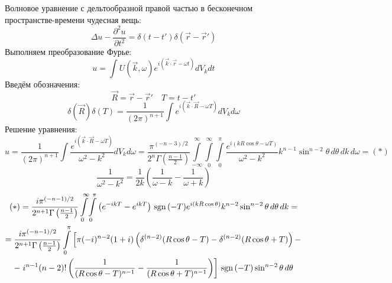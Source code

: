 Волновое уравнение с дельтообразной правой частью в бесконечном пространстве-времени чудесная вещь:
\[
	\Delta u - \frac{\partial^2 u}{\partial t^2} = \delta(t - t')\delta(\vec{r} - \vec{r}') 
\]
Выполняем преобразование Фурье:
\[
	u = \int U(\vec{k}, \omega) e^{i(\vec{k}\cdot\vec{r} - \omega t)} dV_k dt
\]
Введём обозначения:
\[
	\vec{R} = \vec{r} - \vec{r}' \quad T = t - t'
\]
\[
	\delta(\vec{R}) \delta(T) = \frac{1}{(2\pi)^{n + 1}} \int e^{i(\vec{k}\cdot\vec{R} - \omega T)} dV_k d\omega
\]
Решение уравнения:
\[
	u = \frac{1}{(2\pi)^{n + 1}} \int \frac{e^{i(\vec{k}\cdot\vec{R} - \omega T)}}{\omega^2 - k^2} dV_k d\omega =  
	\frac{\pi^{(- n - 3)/2}}{2^n\Gamma\left(\frac{n - 1}{2}\right)} 
	\int\limits_{-\infty}^{\infty}\!
	\int\limits_{0}^{\infty}\!
	\int\limits_{0}^{\pi}
	 \frac{e^{i(k R \cos \theta - \omega T)}}{\omega^2 - k^2} k^{n - 1} \sin^{n - 2} \theta\, d\theta\, dk\, d\omega = (*)
\]
\[
	\frac{1}{\omega^2 - k^2} = \frac{1}{2k} \left(\frac{1}{\omega - k} - \frac{1}{\omega + k} \right)
\]
\[
	\begin{gathered}
	(*) =
	\frac{i \pi^{(- n - 1)/2}}{2^{n + 1}\Gamma\left(\frac{n - 1}{2}\right)} 
	\int\limits_{0}^{\infty}\!
	\int\limits_{0}^{\pi}
	\left(e^{ - i k T}  - e^{i k T} \right) \mathrm{\,sgn}\,(-T)
	e^{i(k R \cos \theta)} 
	k^{n - 2} \sin^{n - 2} \theta\, d\theta\, dk
	= \\ 
	=
	\frac{i \pi^{(- n - 1)/2}}{2^{n + 1}\Gamma\left(\frac{n - 1}{2}\right)} 
	\int\limits_{0}^{\pi}
	\left[
	\pi (-i)^{n - 2} (1 + i) \left(\delta^{(n - 2)}(R \cos \theta - T)  - \delta^{(n - 2)}(R \cos \theta + T) \right)
	-
	\right.
	\\ -
	\left.
	i^{n - 1} (n - 2)! \left(\frac{1}{(R \cos \theta - T)^{n - 1}} - \frac{1}{(R \cos \theta + T)^{n - 1}}\right)
	\right]
	\mathrm{\,sgn}\,(-T) 
	\sin^{n - 2} \theta\, d\theta
	\end{gathered} 
\]